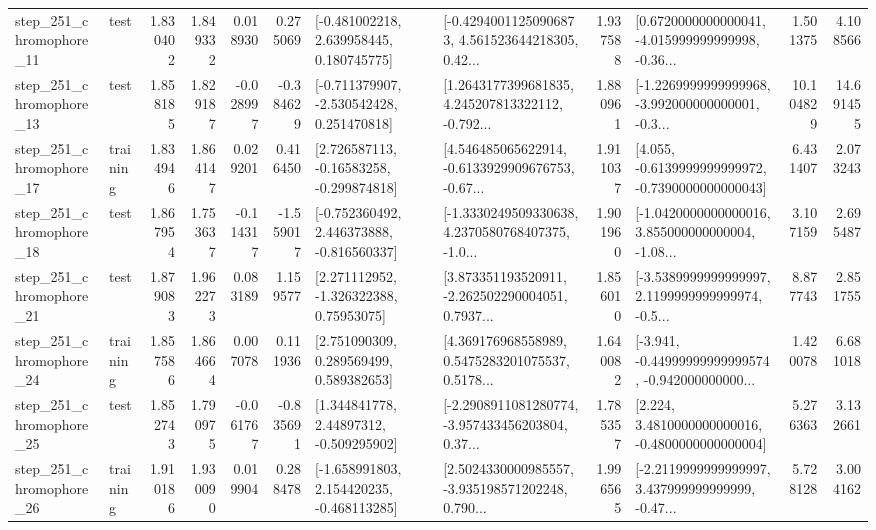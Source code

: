 \begin{tabular}{llrrrrllrlrr}
  step\_251\_chromophore\_11 &      test &      1.830402 &    1.849332 &      0.018930 &  0.275069 &    [-0.481002218, 2.639958445, 0.180745775] &  [-0.42940011250906873, 4.561523644218305, 0.42... &       1.937588 &  [0.6720000000000041, -4.015999999999998, -0.36... &            1.501375 &          4.108566 \\
  step\_251\_chromophore\_13 &      test &      1.858185 &    1.829187 &     -0.028997 & -0.384629 &   [-0.711379907, -2.530542428, 0.251470818] &  [1.2643177399681835, 4.245207813322112, -0.792... &       1.880961 &  [-1.2269999999999968, -3.992000000000001, -0.3... &           10.104829 &         14.691455 \\
  step\_251\_chromophore\_17 &  training &      1.834946 &    1.864147 &      0.029201 &  0.416450 &    [2.726587113, -0.16583258, -0.299874818] &  [4.546485065622914, -0.6133929909676753, -0.67... &       1.911037 &  [4.055, -0.6139999999999972, -0.7390000000000043] &            6.431407 &          2.073243 \\
  step\_251\_chromophore\_18 &      test &      1.867954 &    1.753637 &     -0.114317 & -1.559017 &   [-0.752360492, 2.446373888, -0.816560337] &  [-1.3330249509330638, 4.2370580768407375, -1.0... &       1.901960 &  [-1.0420000000000016, 3.855000000000004, -1.08... &            3.107159 &          2.695487 \\
  step\_251\_chromophore\_21 &      test &      1.879083 &    1.962273 &      0.083189 &  1.159577 &     [2.271112952, -1.326322388, 0.75953075] &  [3.873351193520911, -2.262502290004051, 0.7937... &       1.856010 &  [-3.5389999999999997, 2.1199999999999974, -0.5... &            8.877743 &          2.851755 \\
  step\_251\_chromophore\_24 &  training &      1.857586 &    1.864664 &      0.007078 &  0.111936 &     [2.751090309, 0.289569499, 0.589382653] &  [4.369176968558989, 0.5475283201075537, 0.5178... &       1.640082 &  [-3.941, -0.44999999999999574, -0.942000000000... &            1.420078 &          6.681018 \\
  step\_251\_chromophore\_25 &      test &      1.852743 &    1.790975 &     -0.061767 & -0.835691 &     [1.344841778, 2.44897312, -0.509295902] &  [-2.2908911081280774, -3.957433456203804, 0.37... &       1.785357 &   [2.224, 3.4810000000000016, -0.4800000000000004] &            5.276363 &          3.132661 \\
  step\_251\_chromophore\_26 &  training &      1.910186 &    1.930090 &      0.019904 &  0.288478 &   [-1.658991803, 2.154420235, -0.468113285] &  [2.5024330000985557, -3.935198571202248, 0.790... &       1.996565 &  [-2.2119999999999997, 3.437999999999999, -0.47... &            5.728128 &          3.004162 \\

\end{tabular}
